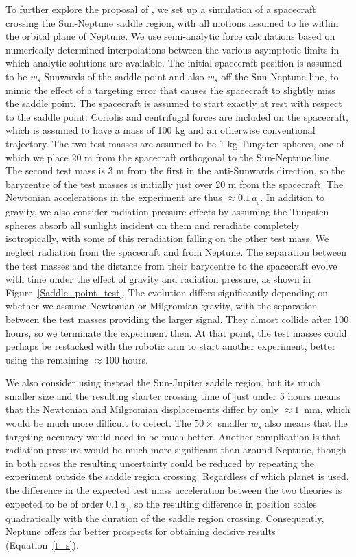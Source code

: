 \documentclass[fleqn,usenatbib,useAMS]{mnras} %
\begin{document}
To further explore the proposal of \citet{Penner_2020}, we set up a simulation of a spacecraft crossing the Sun-Neptune saddle region, with all motions assumed to lie within the orbital plane of Neptune. We use semi-analytic force calculations based on numerically determined interpolations between the various asymptotic limits in which analytic solutions are available. The initial spacecraft position is assumed to be $w_s$ Sunwards of the saddle point and also $w_s$ off the Sun-Neptune line, to mimic the effect of a targeting error that causes the spacecraft to slightly miss the saddle point. The spacecraft is assumed to start exactly at rest with respect to the saddle point. Coriolis and centrifugal forces are included on the spacecraft, which is assumed to have a mass of 100 kg and an otherwise conventional trajectory. The two test masses are assumed to be 1 kg Tungsten spheres, one of which we place 20 m from the spacecraft orthogonal to the Sun-Neptune line. The second test mass is 3 m from the first in the anti-Sunwards direction, so the barycentre of the test masses is initially just over 20 m from the spacecraft. The Newtonian accelerations in the experiment are thus $\approx 0.1 \, a_{_0}$. In addition to gravity, we also consider radiation pressure effects by assuming the Tungsten spheres absorb all sunlight incident on them and reradiate completely isotropically, with some of this reradiation falling on the other test mass. We neglect radiation from the spacecraft and from Neptune. The separation between the test masses and the distance from their barycentre to the spacecraft evolve with time under the effect of gravity and radiation pressure, as shown in Figure~\ref{Saddle_point_test}. The evolution differs significantly depending on whether we assume Newtonian or Milgromian gravity, with the separation between the test masses providing the larger signal. They almost collide after 100 hours, so we terminate the experiment then. At that point, the test masses could perhaps be restacked with the robotic arm to start another experiment, better using the remaining $\approx 100$ hours.

We also consider using instead the Sun-Jupiter saddle region, but its much smaller size and the resulting shorter crossing time of just under 5 hours means that the Newtonian and Milgromian displacements differ by only $\approx 1$~mm, which would be much more difficult to detect. The $50\times$ smaller $w_s$ also means that the targeting accuracy would need to be much better. Another complication is that radiation pressure would be much more significant than around Neptune, though in both cases the resulting uncertainty could be reduced by repeating the experiment outside the saddle region crossing. Regardless of which planet is used, the difference in the expected test mass acceleration between the two theories is expected to be of order $0.1\,a_{_0}$, so the resulting difference in position scales quadratically with the duration of the saddle region crossing. Consequently, Neptune offers far better prospects for obtaining decisive results (Equation~\ref{t_s}).
\end{document}

